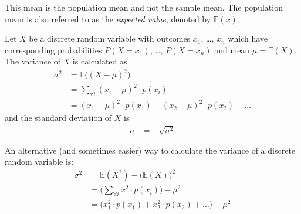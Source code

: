 This mean is the population mean  and not the sample mean.
The population mean is also referred to as the \textit{expected value}, denoted by 
$\mathbb{E}(x)$. 

\begin{definition}
Let $X$ be a discrete random variable with outcomes $x_{1}$, \ldots, $x_{n}$
which have corresponding probabilities $P(X = x_{1})$, \ldots, $P(X = x_{n})$
and mean $\mu = \mathbb{E}(X)$.
The variance of $X$ is calculated as
\begin{align}
\sigma^{2}	 & = \mathbb{E} \big( (X - \mu)^{2} \big)\\
		 & = \displaystyle\sum_{\forall i} (x_{i} - \mu)^{2} \cdot p(x_{i}) \\
		& = (x_{1} - \mu)^{2} \cdot p(x_{1}) + (x_{2} - \mu)^{2} \cdot p(x_{2}) + \ldots
\end{align}
\noindent
and the standard deviation of $X$ is 
\begin{align}
\sigma	& = + \sqrt{ \sigma^{2} }
\end{align}
\end{definition}

\hfill
\begin{nt}
An alternative (and sometimes easier) way to calculate the variance of a discrete random variable is:
\begin{align}
\sigma^{2}		& = \mathbb{E}(X^{2}) - \big( \mathbb{E}(X) \big)^{2}	\\
			& = \bigg(\displaystyle\sum_{\forall i}  x^{2} \cdot p(x_{i})  \bigg) - \mu^{2} \\
			& = \bigg( x_{1}^{2} \cdot p(x_{1}) + x_{2}^{2} \cdot p(x_{2}) + \ldots \bigg) - \mu^{2}
\end{align}
\end{nt}

